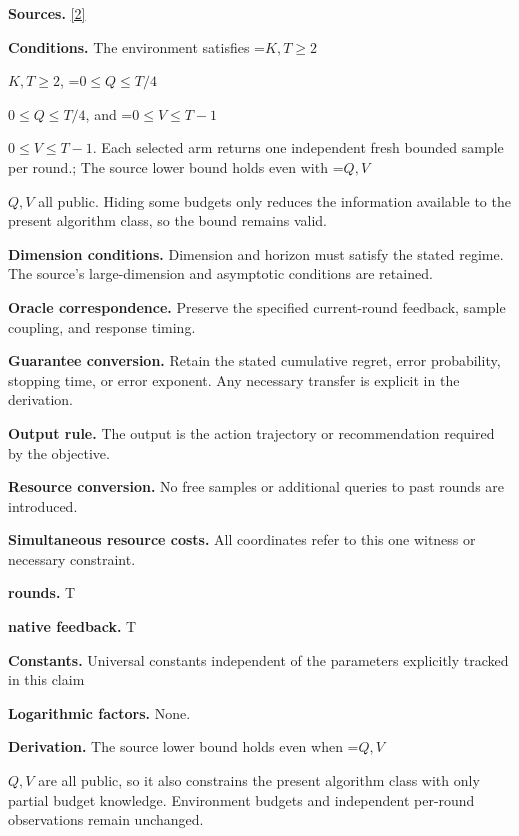 \documentclass[10pt,a4paper]{article}
\newcommand{\AtlasMath}[1]{\par\begingroup\centering\setbox0=\hbox{$\displaystyle #1$}\ifdim\wd0>1.4\linewidth\typeout{ATLAS WIDE FORMULA: \the\wd0}\fi\ifdim\wd0>\linewidth\resizebox{\linewidth}{!}{\box0}\else\box0\fi\par\endgroup}
\newcommand{\AtlasInlineMath}[1]{\begingroup\setbox0=\hbox{$#1$}\ifdim\wd0>.4\linewidth\endgroup\AtlasMath{#1}\else\endgroup$#1$\fi}
\begin{document}
\textbf{Sources.} \href{https://arxiv.org/pdf/2610.26116}{[2]}



\textbf{Conditions.} The environment satisfies \AtlasInlineMath{K,T\ge2}, \AtlasInlineMath{0\le Q\le T/4}, and \AtlasInlineMath{0\le V\le T-1}. Each selected arm returns one independent fresh bounded sample per round.; The source lower bound holds even with \AtlasInlineMath{Q,V} all public. Hiding some budgets only reduces the information available to the present algorithm class, so the bound remains valid.



\textbf{Dimension conditions.} Dimension and horizon must satisfy the stated regime. The source's large-dimension and asymptotic conditions are retained.



\textbf{Oracle correspondence.} Preserve the specified current-round feedback, sample coupling, and response timing.



\textbf{Guarantee conversion.} Retain the stated cumulative regret, error probability, stopping time, or error exponent. Any necessary transfer is explicit in the derivation.



\textbf{Output rule.} The output is the action trajectory or recommendation required by the objective.



\textbf{Resource conversion.} No free samples or additional queries to past rounds are introduced.



\textbf{Simultaneous resource costs.} All coordinates refer to this one witness or necessary constraint.



\textbf{rounds.} T



\textbf{native feedback.} T



\textbf{Constants.} Universal constants independent of the parameters explicitly tracked in this claim



\textbf{Logarithmic factors.} None.



\textbf{Derivation.} The source lower bound holds even when \AtlasInlineMath{Q,V} are all public, so it also constrains the present algorithm class with only partial budget knowledge. Environment budgets and independent per-round observations remain unchanged.
\end{document}
